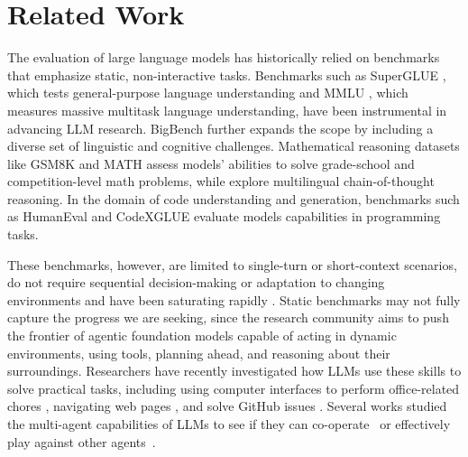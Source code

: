 \section{Related Work}


The evaluation of large language models has historically relied on benchmarks that emphasize static, non-interactive tasks. Benchmarks such as SuperGLUE \citep{wang2019superglue}, which tests general-purpose language understanding and MMLU \citep{hendrycks2020measuring}, which measures massive multitask language understanding, have been instrumental in advancing LLM research. BigBench \citep{srivastava2022beyond} further expands the scope by including a diverse set of linguistic and cognitive challenges. Mathematical reasoning datasets like GSM8K and MATH \citep{cobbe2021training, hendrycks2021measuring} assess models' abilities to solve grade-school and competition-level math problems, while \citet{shi2022language} explore multilingual chain-of-thought reasoning. In the domain of code understanding and generation, benchmarks such as HumanEval \citep{chen2021evaluating} and CodeXGLUE \citep{lu2021codexglue} evaluate models capabilities in programming tasks. 

These benchmarks, however, are limited to single-turn or short-context scenarios, do not require sequential decision-making or adaptation to changing environments and have been saturating rapidly \citep{kiela2021dynabench}. Static benchmarks may not fully capture the progress we are seeking, since the research community aims to push the frontier of agentic foundation models capable of acting in dynamic environments, using tools, planning ahead, and reasoning about their surroundings. Researchers have recently investigated how LLMs use these skills to solve practical tasks, including using computer interfaces to perform office-related chores \citep{wang2024officebench,qin2024sysbench}, navigating web pages \citep{yao2022webshop, zhou2023webarena}, and solve GitHub issues \citep{jimenez2023swe}. Several works studied the multi-agent capabilities of LLMs to see if they can co-operate~\citep{gong2023mindagent,piatti2024cooperate} or effectively play against other agents~\citep{jin2024learning,wu2024enhance}.

